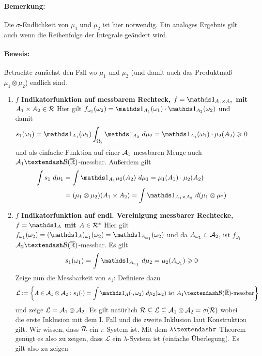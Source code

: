 \documentclass[11pt]{report}
\begin{document}
\paragraph{Bemerkung:}Die $\sigma$-Endlichkeit von $\mu_1$ und $\mu_2$ ist hier notwendig. Ein analoges Ergebnis gilt auch wenn die Reihenfolge der Integrale ge\"andert wird.

\paragraph{Beweis:}Betrachte zun\"achst den Fall wo $\mu_1$ und $\mu_2$ (und damit auch das Produktma\ss{} $\mu_1\otimes\mu_2$) endlich sind.
\begin{enumerate}[label=\Roman*.]
    \item \textbf{$f$ Indikatorfunktion auf messbarem Rechteck, $f=\ind{A_1\times A_2}$ mit $A_1\times A_2\in\mathcal{R}$}\newline
    Hier gilt $f_{\omega_1}(\omega_2)=\ind{A_1}(\omega_1)\cdot\ind{A_2}(\omega_2)$ und damit 
    $$s_1(\omega_1)=\ind{A_1}(\omega_1)\int_{\Omega_2}\ind{A_2}\ d\mu_2=\ind{A_1}(\omega_1)\cdot\mu_2(A_2)\geq0$$
    und als einfache Funktion auf einer $\mathcal{A}_1$-messbaren Menge auch $\A_1\textendash\mathcal{B}(\overline\R)$-messbar. Au\ss{}erdem gilt
    \begin{align*}
        \int s_1\ d\mu_1&=\int\ind{A_1}\mu_2(A_2)\ d\mu_1=\mu_1(A_1)\cdot\mu_2(A_2)\\
        &=(\mu_1\otimes\mu_2)(A_1\times A_2)=\int\ind{A_1\times A_2}\ d(\mu_1\otimes\mu_")
    \end{align*}
    \item \textbf{$f$ Indikatorfunktion auf endl. Vereinigung messbarer Rechtecke, $f=\ind{A}$ mit $A\in\mathcal{R}^*$}\newline
    Hier gilt $f_{\omega_1}(\omega_2)=(\ind{A})_{\omega_1}(\omega_2)=\ind{A_{\omega_1}}(\omega_2)$ und da $A_{\omega_1}\in\mathcal{A}_2$, ist $f_{\omega_1}$ $\A_2\textendash\mathcal{B}(\overline\R)$-messbar. Es gilt
    $$s_1(\omega_1)=\int\ind{A_{\omega_1}}\ d\mu_2=\mu_2(A_{\omega_1})\geq0$$
    Zeige nun die Messbarkeit von $s_1$: Definiere dazu
    $$\mathcal{L}:=\left\{A\in\A_1\otimes\A_2:s_1(\cdot)=\int\ind{A}(\cdot,\omega_2)\ d\mu_2(\omega_2) \text{ ist }A_1\textendash\mathcal{B}(\overline\R)\text{-messbar}\right\}$$
    und zeige $\mathcal{L}=\mathcal{A}_1\otimes\mathcal{A}_2$. Es gilt nat\"urlich $\mathcal{R}\subseteq\mathcal{L}\subseteq\mathcal{A}_1\otimes\mathcal{A}_2=\sigma(\mathcal{R})$
    wobei die erste Inklusion mit dem I. Fall und die zweite Inklusion laut Konstruktion gilt. Wir wissen, dass $\mathcal{R}$ ein $\pi$-System ist. Mit dem $\lambda\textendash\pi$-Theorem gen\"ugt es also zu zeigen, dass $\mathcal{L}$ ein $\lambda$-System ist (einfache \"Uberlegung). Es gilt also zu zeigen

\end{enumerate}
\end{document}
